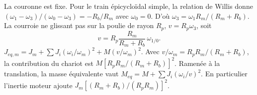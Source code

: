 \begin{corrigebox}
La couronne est fixe. Pour le train épicycloïdal simple,
            la relation de Willis donne
            $(\omega_1-\omega_3)/(\omega_0-\omega_3)=-R_b/R_m$ avec $\omega_0=0$.
            D'où $\omega_3=\omega_1R_m/(R_m+R_b)$. La courroie ne glissant pas sur la
            poulie de rayon $R_p$, $v=R_p\omega_3$, soit
            \[\boxed{v=R_p\frac{R_m}{R_m+R_b}\,\omega_{1/0}}.\]
$J_{eq,m}=J_m+\sum J_i(\omega_i/\omega_m)^2+M(v/\omega_m)^2$.
                Avec $v/\omega_m=R_pR_m/(R_m+R_b)$, la contribution du chariot est
                $M[R_pR_m/(R_m+R_b)]^2$.
Ramenée à la translation, la masse équivalente vaut
                $M_{eq}=M+\sum J_i(\omega_i/v)^2$. En particulier l'inertie moteur ajoute
                $J_m[(R_m+R_b)/(R_pR_m)]^2$.
\end{corrigebox}
